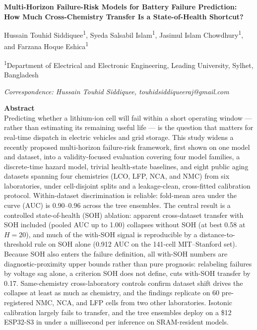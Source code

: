 \documentclass[11pt,a4paper]{article}
\begin{document}
\begin{center}
{\LARGE\bfseries Multi-Horizon Failure-Risk Models for Battery Failure Prediction: How Much Cross-Chemistry Transfer Is a State-of-Health Shortcut?\par}
\vspace{16pt}
{\large Hussain Touhid Siddiquee\textsuperscript{1}, Syeda Salsabil Islam\textsuperscript{1}, Jasimul Islam Chowdhury\textsuperscript{1}, and Farzana Hoque Eshica\textsuperscript{1}\par}
\vspace{9pt}
\textsuperscript{1}Department of Electrical and Electronic Engineering, Leading University, Sylhet, Bangladesh\par
\vspace{7pt}
{\itshape Correspondence: Hussain Touhid Siddiquee, touhidsiddiqueeraj@gmail.com\par}
\end{center}
\vspace{14pt}

\noindent\textbf{Abstract}\\[2pt]
Predicting whether a lithium-ion cell will fail within a short operating window --- rather than estimating its remaining useful life --- is the question that matters for real-time dispatch in electric vehicles and grid storage. This study widens a recently proposed multi-horizon failure-risk framework, first shown on one model and dataset, into a validity-focused evaluation covering four model families, a discrete-time hazard model, trivial health-state baselines, and eight public aging datasets spanning four chemistries (LCO, LFP, NCA, and NMC) from six laboratories, under cell-disjoint splits and a leakage-clean, cross-fitted calibration protocol. Within-dataset discrimination is reliable: fold-mean area under the curve (AUC) is 0.90--0.96 across the tree ensembles. The central result is a controlled state-of-health (SOH) ablation: apparent cross-dataset transfer with SOH included (pooled AUC up to 1.00) collapses without SOH (at best 0.58 at $H{=}20$), and much of the with-SOH signal is reproducible by a distance-to-threshold rule on SOH alone (0.912 AUC on the 141-cell MIT--Stanford set). Because SOH also enters the failure definition, all with-SOH numbers are diagnostic-proximity upper bounds rather than pure prognosis: relabeling failures by voltage sag alone, a criterion SOH does not define, cuts with-SOH transfer by 0.17. Same-chemistry cross-laboratory controls confirm dataset shift drives the collapse at least as much as chemistry, and the findings replicate on 60 pre-registered NMC, NCA, and LFP cells from two other laboratories. Isotonic calibration largely fails to transfer, and the tree ensembles deploy on a \$12 ESP32-S3 in under a millisecond per inference on SRAM-resident models.
\end{document}
